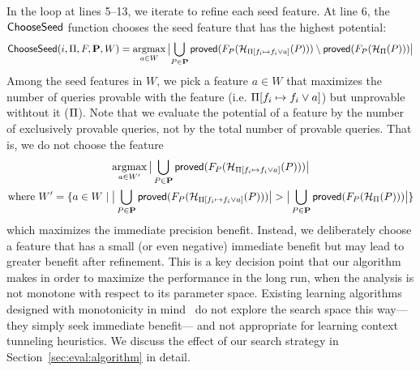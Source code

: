 


In the loop at lines 5--13, we iterate to refine each seed feature.
At line 6, the ${\sf ChooseSeed}$ function chooses the seed feature that
has the highest potential:
\[
  \ChooseSeed(i,\params, F, \vec{P}, W)=\argmax_{a\in W}\big\lvert
  {\bigcup_{P\in \vec{P}}{ \precision(F_P(\heuristic_{\params{[f_i
          \mapsto f_i \vee a]}}(P)))} \setminus
    \precision(F_P(\heuristic_{\params}(P))) }\big\rvert
\]
Among the seed features in $W$, we pick a feature $a \in W$ that
maximizes the number of queries provable with the feature
(i.e. $\Pi[f_i \mapsto f_i \vee a]$) but unprovable withtout it
($\Pi$).  Note that we evaluate the potential of a feature by the
number of exclusively provable queries, not by the total number of
provable queries.  That is, we do not choose the feature
\begin{multline}\label{eq:greedy-choose-seed}
\argmax_{a\in W'}\big\lvert \bigcup_{P\in \vec{P}}{
    \precision(F_P(\heuristic_{\params{[f_i \mapsto f_i \vee
        a]}}(P)))} \big\rvert\\\text{where}~W'=\myset{a\in W \mid \big\lvert \bigcup_{P\in \vec{P}}{\precision(F_P(\heuristic_{\params{[f_i \mapsto f_i \vee a]}}(P)))} \big\rvert > \big\lvert \bigcup_{P\in \vec{P}}{\precision(F_P(\heuristic_{\params}(P)))} \big\rvert}
\end{multline}
which maximizes the immediate precision benefit. Instead, we
deliberately choose a feature that has a small (or even negative)
immediate benefit but may lead to greater benefit after refinement.
This is a key decision point that our algorithm makes in order to
maximize the performance in the long run, when the
analysis is not monotone with respect to its
parameter space. Existing learning
algorithms designed with monotonicity in mind~\cite{JeJeChOh17,Liang2011learning} do
not explore the search space this way---they simply seek
immediate benefit--- and not appropriate for learning
context tunneling heuristics. We discuss the effect of
our search strategy in Section~\ref{sec:eval:algorithm} in detail.


